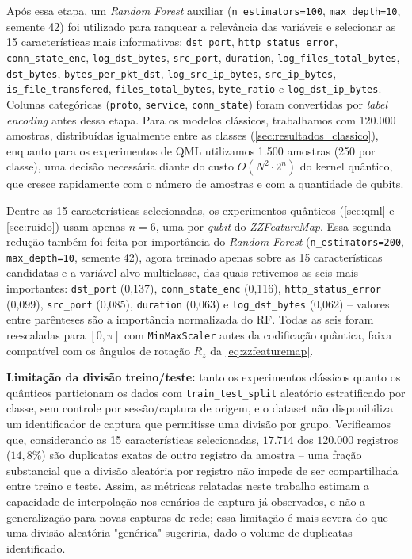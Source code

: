 \documentclass[12pt]{article}
\begin{document}
Após essa etapa, um \textit{Random Forest} auxiliar (\texttt{n\_estimators=100}, \texttt{max\_depth=10}, semente 42) foi utilizado para ranquear a relevância das variáveis e selecionar as 15 características mais informativas: \texttt{dst\_port}, \texttt{http\_status\_error}, \texttt{conn\_state\_enc}, \texttt{log\_dst\_bytes}, \texttt{src\_port}, \texttt{duration}, \texttt{log\_files\_total\_bytes}, \texttt{dst\_bytes}, \texttt{bytes\_per\_pkt\_dst}, \texttt{log\_src\_ip\_bytes}, \texttt{src\_ip\_bytes}, \texttt{is\_file\_transfered}, \texttt{files\_total\_bytes}, \texttt{byte\_ratio} e \texttt{log\_dst\_ip\_bytes}. Colunas categóricas (\texttt{proto}, \texttt{service}, \texttt{conn\_state}) foram convertidas por \textit{label encoding} antes dessa etapa. Para os modelos clássicos, trabalhamos com 120.000 amostras, distribuídas igualmente entre as classes (\autoref{sec:resultados_classico}), enquanto para os experimentos de QML utilizamos 1.500 amostras (250 por classe), uma decisão necessária diante do custo \(O(N^2 \cdot 2^n)\) do kernel quântico, que cresce rapidamente com o número de amostras e com a quantidade de qubits.

Dentre as 15 características selecionadas, os experimentos quânticos (\autoref{sec:qml} e \autoref{sec:ruido}) usam apenas $n=6$, uma por \textit{qubit} do \textit{ZZFeatureMap}. Essa segunda redução também foi feita por importância do \textit{Random Forest} (\texttt{n\_estimators=200}, \texttt{max\_depth=10}, semente 42), agora treinado apenas sobre as 15 características candidatas e a variável-alvo multiclasse, das quais retivemos as seis mais importantes: \texttt{dst\_port} (0,137), \texttt{conn\_state\_enc} (0,116), \texttt{http\_status\_error} (0,099), \texttt{src\_port} (0,085), \texttt{duration} (0,063) e \texttt{log\_dst\_bytes} (0,062) -- valores entre parênteses são a importância normalizada do RF. Todas as seis foram reescaladas para $[0,\pi]$ com \texttt{MinMaxScaler} antes da codificação quântica, faixa compatível com os ângulos de rotação $R_z$ da \autoref{eq:zzfeaturemap}.

\textbf{Limitação da divisão treino/teste:} tanto os experimentos clássicos quanto os quânticos particionam os dados com \texttt{train\_test\_split} aleatório estratificado por classe, sem controle por sessão/captura de origem, e o dataset não disponibiliza um identificador de captura que permitisse uma divisão por grupo. Verificamos que, considerando as 15 características selecionadas, $17.714$ dos $120.000$ registros ($14{,}8\%$) são duplicatas exatas de outro registro da amostra -- uma fração substancial que a divisão aleatória por registro não impede de ser compartilhada entre treino e teste. Assim, as métricas relatadas neste trabalho estimam a capacidade de interpolação nos cenários de captura já observados, e não a generalização para novas capturas de rede; essa limitação é mais severa do que uma divisão aleatória "genérica" sugeriria, dado o volume de duplicatas identificado.
\end{document}
